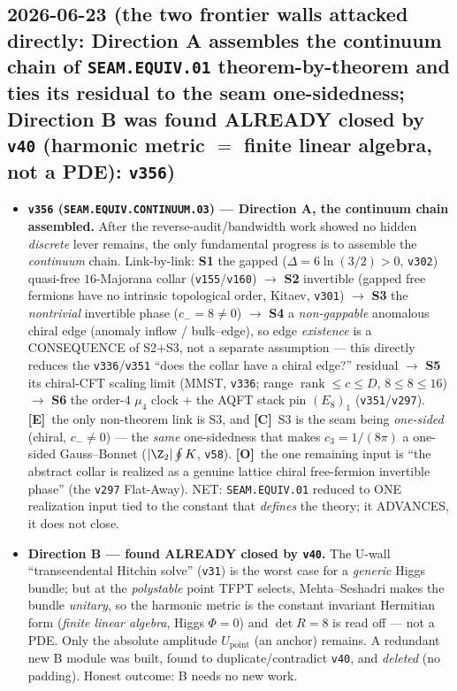 \documentclass[11pt]{article}
\providecommand{\mE}{\textbf{[E]}}\providecommand{\mC}{\textbf{[C]}}
\providecommand{\mO}{\textbf{[O]}}\providecommand{\mX}{\textbf{[X]}}
\providecommand{\vref}[1]{\texttt{#1}}
\providecommand{\cthree}{c_3}\providecommand{\phiz}{\varphi_0^{\mathrm{ret}}}
\begin{document}
\subsection*{2026-06-23 (the two frontier walls attacked directly: Direction A assembles the continuum chain of \texttt{SEAM.EQUIV.01} theorem-by-theorem and ties its residual to the seam one-sidedness; Direction B was found ALREADY closed by \texttt{v40} (harmonic metric $=$ finite linear algebra, not a PDE): \texttt{v356})}
\begin{itemize}
\item \textbf{\texttt{v356} (\texttt{SEAM.EQUIV.CONTINUUM.03}) --- Direction A, the continuum chain assembled.} After the
reverse-audit/bandwidth work showed no hidden \emph{discrete} lever remains, the only fundamental progress is to
assemble the \emph{continuum} chain. Link-by-link: \textbf{S1} the gapped ($\Delta{=}6\ln(3/2){>}0$, \vref{v302})
quasi-free $16$-Majorana collar (\vref{v155}/\vref{v160}) $\to$ \textbf{S2} invertible (gapped free fermions have no
intrinsic topological order, Kitaev, \vref{v301}) $\to$ \textbf{S3} the \emph{nontrivial} invertible phase
($c_-{=}8{\neq}0$) $\to$ \textbf{S4} a \emph{non-gappable} anomalous chiral edge (anomaly inflow / bulk--edge), so
edge \emph{existence} is a CONSEQUENCE of S2$+$S3, not a separate assumption --- this directly reduces the
\vref{v336}/\vref{v351} ``does the collar have a chiral edge?'' residual $\to$ \textbf{S5} its chiral-CFT scaling limit
(MMST, \vref{v336}; range $\operatorname{rank}\le c\le D$, $8\le8\le16$) $\to$ \textbf{S6} the order-$4$ $\mu_4$ clock
$+$ the AQFT stack pin $(E_8)_1$ (\vref{v351}/\vref{v297}). \mE\ the only non-theorem link is S3, and \mC\ S3 is the
seam being \emph{one-sided} (chiral, $c_-{\neq}0$) --- the \emph{same} one-sidedness that makes $\cthree{=}1/(8\pi)$ a
one-sided Gauss--Bonnet ($|\Z_2|\oint K$, \vref{v58}). \mO\ the one remaining input is ``the abstract collar is
realized as a genuine lattice chiral free-fermion invertible phase'' (the \vref{v297} Flat-Away). NET: \texttt{SEAM.EQUIV.01}
reduced to ONE realization input tied to the constant that \emph{defines} the theory; it ADVANCES, it does not close.
\item \textbf{Direction B --- found ALREADY closed by \vref{v40}.} The U-wall ``transcendental Hitchin solve'' (\vref{v31})
is the worst case for a \emph{generic} Higgs bundle; but at the \emph{polystable} point TFPT selects, Mehta--Seshadri
makes the bundle \emph{unitary}, so the harmonic metric is the constant invariant Hermitian form (\emph{finite linear
algebra}, Higgs $\Phi{=}0$) and $\det R{=}8$ is read off --- not a PDE. Only the absolute amplitude $U_{\mathrm{point}}$
(an anchor) remains. A redundant new B module was built, found to duplicate/contradict \vref{v40}, and \emph{deleted}
(no padding). Honest outcome: B needs no new work.
\end{itemize}
\end{document}
